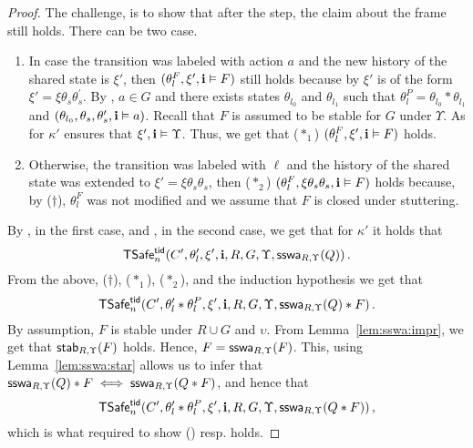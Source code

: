 \begin{proof}
The challenge, is to show that after the step, the claim about the frame still holds.
There can be two case.
\begin{enumerate}
\item
In case the transition was labeled with action $a$ and the new history 
of the shared state is $\xi'$, 
then $(\theta^F_l,\xi',\intp \vDash F)$ still holds because 
by    $\xi'$ is of the form   
$\xi'=\xi\theta_s\theta^{'}_s$.
By ,   $a \in G$ and there exists states $\theta_{l_0}$ and $\theta_{l_1}$
such that $\theta^P_{l} = \theta_{l_0} * \theta_{l_1}$  and
$(\theta_{l_0},\theta_s,\theta_s',\intp \vDash a)$.
Recall that $F$ is assumed to be stable for $G$ under $\Upsilon$.
As  for $\kappa'$ ensures that $\xi',\intp\vDash\Upsilon$. 
Thus, we get that ($*_1$) $(\theta^F_l,\xi',\intp \vDash F)$ holds.
\item
Otherwise, the transition was labeled with $\ell$ and 
the history  of the shared state was extended to  $\xi' = \xi\theta_s\theta_s$, then 
($*_2$) $(\theta^F_l,\xi\theta_s\theta_s,\intp \vDash F)$ holds because, by  ($\dag$), 
$\theta^F_l$ was not modified and we assume that $F$ is closed under stuttering. 
\end{enumerate}
By , in the first case, and  , in the second case,
we get that for $\kappa'$ it holds that 
$$
\safe_n(C',\theta_l',\xi',\intp,R,G,\Upsilon,\sswa{Q}{R}{\Upsilon})\,.
$$
From the above, ($\dag$), ($*_1$), ($*_2$), and the induction hypothesis
we get that 
$$
\safe_n(C',\theta_l'*\theta_l^P,\xi',\intp,R,G,\Upsilon,\sswa{Q}{R}{\Upsilon} * F)\,.
$$
By assumption, $F$ is stable under $R\cup G$ and $\upsilon$.
From Lemma~\ref{lem:sswa:impr}, we get that $\stable{F}{R}{\Upsilon}$ holds.
Hence, $F = \sswa{F}{R}{\Upsilon}$. 
This, using Lemma~\ref{lem:sswa:star} allows us to infer that 
$\sswa{Q}{R}{\Upsilon} * F \iff \sswa{Q * F}{R}{\Upsilon}$, and hence that 
$$
\safe_n(C',\theta_l'*\theta_l^P,\xi',\intp,R,G,\Upsilon,\sswa{Q * F}{R}{\Upsilon})\,,
$$
which  is what required to show () resp.  holds.


\end{proof}
